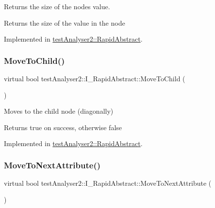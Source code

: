 Returns the size of the nodes value. 

\begin{DoxyReturn}{Returns}
the size of the value in the node 
\end{DoxyReturn}


Implemented in \mbox{\hyperlink{classtestAnalyser2_1_1RapidAbstract_a04603ede543eac5c9c76050cbfe768db}{test\+Analyser2\+::\+Rapid\+Abstract}}.

\mbox{\label{classtestAnalyser2_1_1I__RapidAbstract_a9d646b222f88e3baf52ca808288bc7c2}} 
\subsubsection{\texorpdfstring{MoveToChild()}{MoveToChild()}}
{\footnotesize\ttfamily virtual bool test\+Analyser2\+::\+I\+\_\+\+Rapid\+Abstract\+::\+Move\+To\+Child (\begin{DoxyParamCaption}{ }\end{DoxyParamCaption})\hspace{0.3cm}{\ttfamily [pure virtual]}}



Moves to the child node (diagonally) 

\begin{DoxyReturn}{Returns}
true on success, otherwise false 
\end{DoxyReturn}


Implemented in \mbox{\hyperlink{classtestAnalyser2_1_1RapidAbstract_af54437d66d9120ab274569efa1a51873}{test\+Analyser2\+::\+Rapid\+Abstract}}.

\mbox{\label{classtestAnalyser2_1_1I__RapidAbstract_ab26e1f2ca674a3bc10b0a5b71c9a5941}} 
\subsubsection{\texorpdfstring{MoveToNextAttribute()}{MoveToNextAttribute()}}
{\footnotesize\ttfamily virtual bool test\+Analyser2\+::\+I\+\_\+\+Rapid\+Abstract\+::\+Move\+To\+Next\+Attribute (\begin{DoxyParamCaption}{ }\end{DoxyParamCaption})\hspace{0.3cm}{\ttfamily [pure virtual]}}



